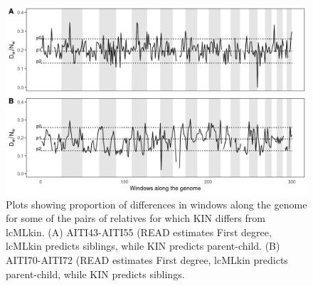 \documentclass[12pt, letterpaper]{article}
\begin{document}
\begin{figure}[h]
    \centering
    \includegraphics[width=18cm]{supplementary_info/plots/egplot2.png}
    \caption{Plots showing proportion of differences in windows along the genome for some of the pairs of relatives for which KIN differs from lcMLkin. (A) AITI43-AITI55 (READ estimates First degree, lcMLkin predicts siblings, while KIN predicts parent-child. (B) AITI70-AITI72 (READ estimates First degree, lcMLkin predicts parent-child, while KIN predicts siblings.}
    \label{figS9:eg2}
\end{figure}



\end{document}
